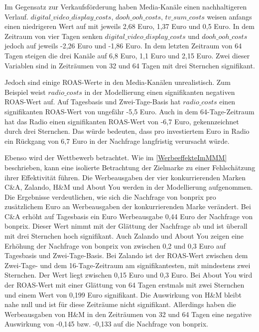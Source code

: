 Im Gegensatz zur Verkaufsförderung haben Media-Kanäle einen nachhaltigeren Verlauf. \(digital\_video\_display\_costs\), \(dooh\_ooh\_costs\), \(tv\_sum\_costs\) weisen anfangs einen niedrigeren Wert auf mit jeweils 2,68 Euro, 1,37 Euro und 0,5 Euro. In dem Zeitraum von vier Tagen senken \(digital\_video\_display\_costs\) und \(dooh\_ooh\_costs\) jedoch auf jeweils -2,26 Euro und -1,86 Euro. In dem letzten Zeitraum von 64 Tagen steigen die drei Kanäle auf 6,8 Euro, 1,1 Euro und 2,15 Euro. Zwei dieser Variablen sind in Zeiträumen von 32 und 64 Tagen mit drei Sternchen signifikant.  
 \par
Jedoch sind einige \ac{ROAS}-Werte in den Media-Kanälen unrealistisch. Zum Beispiel weist \(radio\_costs\) in der Modellierung einen signifikanten negativen \ac{ROAS}-Wert auf. Auf Tagesbasis und Zwei-Tage-Basis hat \(radio\_costs\) einen signifikanten \ac{ROAS}-Wert von ungefähr -5,5 Euro. Auch in dem 64-Tage-Zeitraum hat das Radio einen signifikanten \ac{ROAS}-Wert von -6,7 Euro, gekennzeichnet durch drei Sternchen. Das würde bedeuten, dass pro investiertem Euro in Radio ein Rückgang von 6,7 Euro in der Nachfrage langfristig verursacht würde.  \par
Ebenso wird der Wettbewerb betrachtet. Wie im \autoref{WerbeeffekteImMMM} beschrieben, kann eine isolierte Betrachtung der Zielmarke zu einer Fehlschätzung ihrer Effektivität führen. Die Werbeausgaben der vier konkurrierenden Marken C\&A, Zalando, H\&M und About You werden in der Modellierung aufgenommen. Die Ergebnisse verdeutlichen, wie sich die Nachfrage von bonprix pro zusätzlichem Euro an Werbeausgaben der konkurrierenden Marke verändert. Bei C\&A erhöht auf Tagesbasis ein Euro Werbeausgabe 0,44 Euro der Nachfrage von bonprix. Dieser Wert nimmt mit der Glättung der Nachfrage ab und ist überall mit drei Sternchen hoch signifikant. Auch Zalando und About You zeigen eine Erhöhung der Nachfrage von bonprix von zwischen 0,2 und 0,3 Euro auf Tagesbasis und Zwei-Tage-Basis. Bei Zalando ist der \ac{ROAS}-Wert zwischen dem Zwei-Tage- und dem 16-Tage-Zeitraum am signifikantesten, mit mindestens zwei Sternchen. Der Wert liegt zwischen 0,15 Euro und 0,3 Euro. Bei About You wird der \ac{ROAS}-Wert mit einer Glättung von 64 Tagen erstmals mit zwei Sternchen und einem Wert von 0,199 Euro signifikant. Die Auswirkung von H\&M bleibt nahe null und ist für diese Zeiträume nicht signifikant. Allerdings haben die Werbeausgaben von H\&M in den Zeiträumen von 32 und 64 Tagen eine negative Auswirkung von -0,145 bzw. -0,133 auf die Nachfrage von bonprix.  

